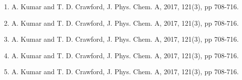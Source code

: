 \begin{enumerate}
\item A. Kumar and T. D. Crawford, J. Phys. Chem. A, 2017, 121(3), pp 708-716.
\item A. Kumar and T. D. Crawford, J. Phys. Chem. A, 2017, 121(3), pp 708-716.
\item A. Kumar and T. D. Crawford, J. Phys. Chem. A, 2017, 121(3), pp 708-716.
\item A. Kumar and T. D. Crawford, J. Phys. Chem. A, 2017, 121(3), pp 708-716.
\item A. Kumar and T. D. Crawford, J. Phys. Chem. A, 2017, 121(3), pp 708-716.
\end{enumerate}
